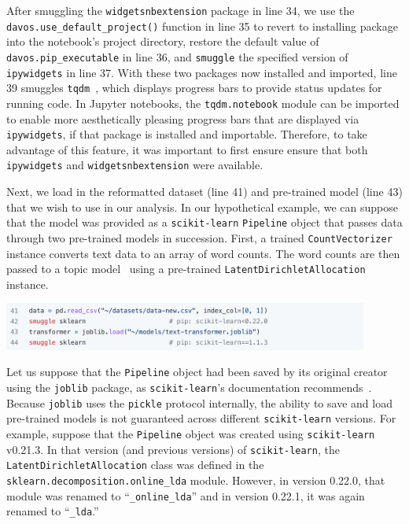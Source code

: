 \documentclass[preprint,12pt,a4paper]{elsarticle}
\begin{document}
After smuggling the \texttt{widgetsnbextension} package in line 34, we use the \texttt{davos.use\_\-default\_\-project()} function in line 35 to revert to installing package into the notebook's project directory, restore the default value of \texttt{davos.pip\_executable} in line 36, and \texttt{smuggle} the specified version of \texttt{ipywidgets} in line 37.
With these two packages now installed
and imported, line 39 smuggles \texttt{tqdm}~\cite{daCoEtal22}, which
displays progress bars to provide status updates for running code. In
Jupyter notebooks, the \texttt{tqdm.notebook} module can be imported
to enable more aesthetically pleasing progress bars that are displayed via
\texttt{ipywidgets}, if that package is installed and
importable. Therefore, to take advantage of this feature, it was
important to first ensure ensure that both \texttt{ipywidgets} and \texttt{widgetsnbextension} were available.

Next, we load in the reformatted dataset (line 41) and pre-trained
model (line 43) that we wish to use in our analysis. In our
hypothetical example, we can suppose that the model was provided as a
\texttt{scikit-learn} \texttt{Pipeline} object that passes data
through two pre-trained models in succession. First, a trained \texttt{CountVectorizer}
instance converts text data to an array of word counts. The
word counts are then passed to a topic model~\cite{BleiEtal03} using a
pre-trained \texttt{LatentDirichletAllocation} instance.
\begin{center}
\includegraphics[width=0.9\textwidth]{figs/example8}
\end{center}
Let us suppose that the \texttt{Pipeline} object had been saved by its
original creator using the \texttt{joblib} package, as
\texttt{scikit-learn}'s documentation recommends~\cite{skle22}. Because
\texttt{joblib} uses the \texttt{pickle} protocol internally, the
ability to save and load pre-trained models is not guaranteed across
different \texttt{scikit-learn} versions. For example, suppose that
the \texttt{Pipeline} object was created using \texttt{scikit-learn}
v0.21.3. In that version (and previous versions) of \texttt{scikit-learn}, the
\texttt{LatentDirichletAllocation} class was defined in
the \texttt{sklearn.de\-comp\-o\-si\-tion.online\_lda} module. However, in version
0.22.0, that module was renamed to ``\texttt{\_online\_lda}'' and in
version 0.22.1, it was again renamed to ``\texttt{\_lda}.''
\end{document}
